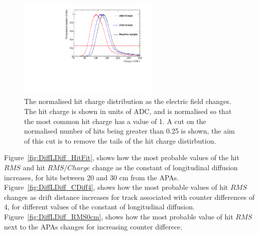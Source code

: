 \begin{figure}[h!]
  \centering
  \includegraphics[width=0.6\textwidth]{Canvas_ChargeCut_ElecField}
  \caption[The normalised hit charge distribution as the electric field changes]
          {The normalised hit charge distribution as the electric field changes. The hit charge is shown in units of ADC, and is normalised so that the most common hit charge has a value of 1. A cut on the normalised number of hits being greater than 0.25 is shown, the aim of this cut is to remove the tails of the hit charge distirbution.}
  \label{fig:DiffElecStudy_ChargeCut}
\end{figure}

Figure~\ref{fig:DiffLDiff_HitFit}, shows how the most probable values of the hit $RMS$ and hit $RMS/Charge$ change as the constant of longitudinal diffusion increases, for hits between 20 and 30 cm from the APAs. Figure~\ref{fig:DiffLDiff_CDiff4}, shows how the most probable values of hit $RMS$ changes as drift distance increases for track associated with counter differences of 4, for different values of the constant of longitudinal diffusion. Figure~\ref{fig:DiffLDiff_RMS0cm}, shows how the most probable value of hit $RMS$ next to the APAs changes for increasing counter differece. \\ 

